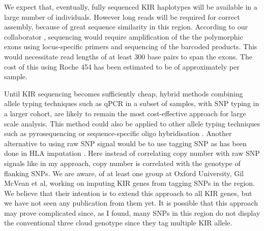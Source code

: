 We expect that, eventually, fully sequenced KIR haplotypes will be available in a large number of individuals.
However long reads will be required for correct assembly, because of great sequence similarity in this region.
According to our collaborator , sequencing would require amplification of the the polymorphic exons
using locus-specific primers and sequencing of the barcoded products.
This would necessitate read lengths of at least 300 base pairs to span the exons.
The cost of this using Roche 454 has been estimated to be of approximately  per sample.


Until KIR sequencing becomes sufficiently cheap, hybrid methods combining allele typing techniques such as qPCR
in a subset of samples, with SNP typing in a larger cohort, are likely to remain the most cost-effective approach for large scale analysis.  
This method could also be applied to other allele typing techniques such as pyrosequencing \citep{Norman:2009fi} or sequence-specific oligo hybridisation \citep{Martin:2007ik}.
Another alternative to using raw SNP signal would be to use tagging SNP as has been done in HLA imputation \citep{Leslie:2008dq,Dilthey:2013dn}.
Here instead of correlating copy number with raw SNP signals like in my approach, copy number is correlated with the genotype of flanking SNPs.
We are aware, of at least one group at Oxford University, Gil McVean et al, working on imputing KIR genes from tagging SNPs in the region.  
We believe that their intention is to extend this approach to all KIR genes, but we have not seen any publication from them yet.
It is possible that this approach may prove complicated since, as I found, many SNPs in this region do not display the conventional three cloud genotype since
they tag multiple KIR allele.


